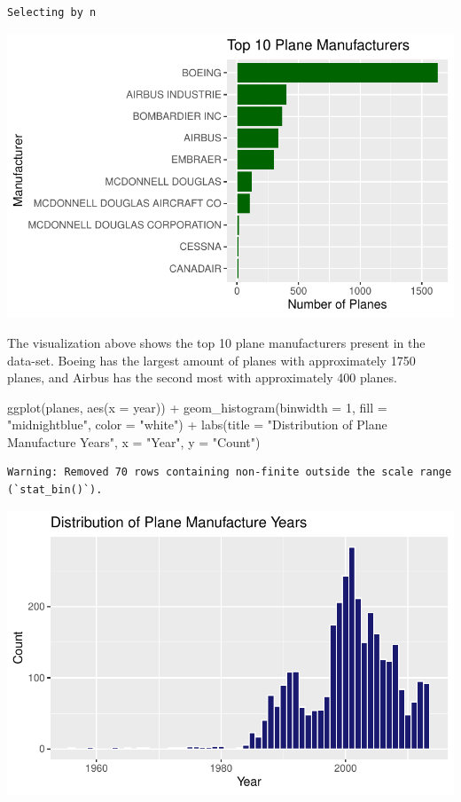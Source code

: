\documentclass[
  10pt,
  letterpaper,
  DIV=11,
  numbers=noendperiod]{scrartcl}
\newenvironment{Shaded}{\begin{snugshade}}{\end{snugshade}}
\newcommand{\AttributeTok}[1]{\textcolor[rgb]{0.40,0.45,0.13}{#1}}
\newcommand{\DecValTok}[1]{\textcolor[rgb]{0.68,0.00,0.00}{#1}}
\newcommand{\FunctionTok}[1]{\textcolor[rgb]{0.28,0.35,0.67}{#1}}
\newcommand{\NormalTok}[1]{\textcolor[rgb]{0.00,0.23,0.31}{#1}}
\newcommand{\SpecialCharTok}[1]{\textcolor[rgb]{0.37,0.37,0.37}{#1}}
\newcommand{\StringTok}[1]{\textcolor[rgb]{0.13,0.47,0.30}{#1}}
\begin{document}
\begin{verbatim}
Selecting by n
\end{verbatim}

\includegraphics{6-StatistciallySpeaking_files/figure-pdf/unnamed-chunk-9-1.pdf}

The visualization above shows the top 10 plane manufacturers present in
the data-set. Boeing has the largest amount of planes with approximately
1750 planes, and Airbus has the second most with approximately 400
planes.

\begin{Shaded}
\begin{Highlighting}[numbers=left,,]
\FunctionTok{ggplot}\NormalTok{(planes, }\FunctionTok{aes}\NormalTok{(}\AttributeTok{x =}\NormalTok{ year)) }\SpecialCharTok{+}
  \FunctionTok{geom\_histogram}\NormalTok{(}\AttributeTok{binwidth =} \DecValTok{1}\NormalTok{, }\AttributeTok{fill =} \StringTok{"midnightblue"}\NormalTok{, }\AttributeTok{color =} \StringTok{"white"}\NormalTok{) }\SpecialCharTok{+}
  \FunctionTok{labs}\NormalTok{(}\AttributeTok{title =} \StringTok{"Distribution of Plane Manufacture Years"}\NormalTok{, }\AttributeTok{x =} \StringTok{"Year"}\NormalTok{, }\AttributeTok{y =} \StringTok{"Count"}\NormalTok{)}
\end{Highlighting}
\end{Shaded}

\begin{verbatim}
Warning: Removed 70 rows containing non-finite outside the scale range
(`stat_bin()`).
\end{verbatim}

\includegraphics{6-StatistciallySpeaking_files/figure-pdf/unnamed-chunk-10-1.pdf}
\end{document}
